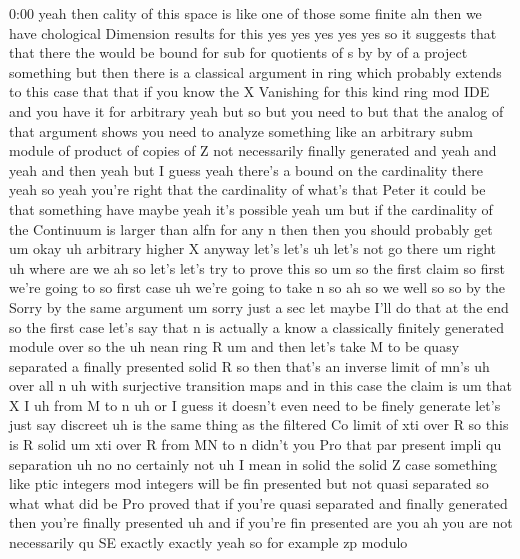 \begin{unfinished}{0:00}
yeah  then  cality  of  this  space  is
like  one  of  those  some  finite
aln  then  we  have  chological  Dimension
results  for  this  yes  yes  yes  yes  yes  so
it  suggests  that  that  there  the  would  be
bound
for  sub  for  quotients  of  s  by  by  of  a
project  something  but  then  there  is  a
classical  argument  in  ring  which
probably  extends  to  this  case
that  that  if  you  know  the  X  Vanishing
for  this  kind  ring  mod  IDE  and  you  have
it  for  arbitrary  yeah  but  so  but  you
need  to  but  that  the  analog  of  that
argument  shows  you  need  to  analyze
something  like  an  arbitrary  subm  module
of  product  of  copies  of  Z  not
necessarily  finally  generated  and  yeah
and  yeah  and  then  yeah  but  I  guess  yeah
there's  a  bound  on  the  cardinality
there  yeah  so
yeah  you're  right  that  the  cardinality
of  what's  that
Peter  it  could  be  that
something
have  maybe  yeah  it's  possible  yeah
um
but  if  the  cardinality  of  the  Continuum
is  larger  than  alfn  for  any  n  then  then
you  should  probably  get  um  okay  uh
arbitrary  higher  X  anyway  let's  let's  uh
let's  not  go  there
um  right  uh  where  are  we  ah  so  let's
let's  try  to  prove  this
so
um  so  the  first  claim  so  first  we're
going
to  so
first
case  uh  we're  going  to  take  n  so  ah  so
we  well
so  so  by  the  Sorry  by  the  same  argument
um  sorry  just  a  sec  let  maybe  I'll  do
that  at  the  end  so  the  first
case  let's  say  that  n  is  actually
a  know  a  classically  finitely  generated
module
over  so  the
uh  nean  ring
R
um  and  then  let's  take  M  to  be  quasy
separated  a  finally  presented  solid
R  so  then  that's  an  inverse  limit  of
mn's  uh  over  all
n  uh  with  surjective  transition
maps  and  in  this  case  the  claim  is
um  that  X
I  uh  from  M  to  n  uh  or  I  guess  it
doesn't  even  need  to  be  finely  generate
let's  just  say  discreet  uh  is  the  same
thing  as  the  filtered  Co  limit  of
xti  over  R  so  this  is  R  solid  um  xti
over  R  from  MN  to
n
didn't  you  Pro  that  par  present  impli  qu
separation  uh
no  no  certainly  not  uh  I  mean  in  solid
the  solid  Z  case  something  like  ptic
integers  mod  integers  will  be  fin
presented  but  not  quasi
separated  so  what  what  did  be  Pro  proved
that  if  you're  quasi  separated  and
finally  generated  then  you're  finally
presented
uh  and  if  you're  fin  presented  are  you
ah  you  are  not  necessarily  qu  SE
exactly  exactly  yeah  so  for  example  zp
modulo

\end{unfinished}

